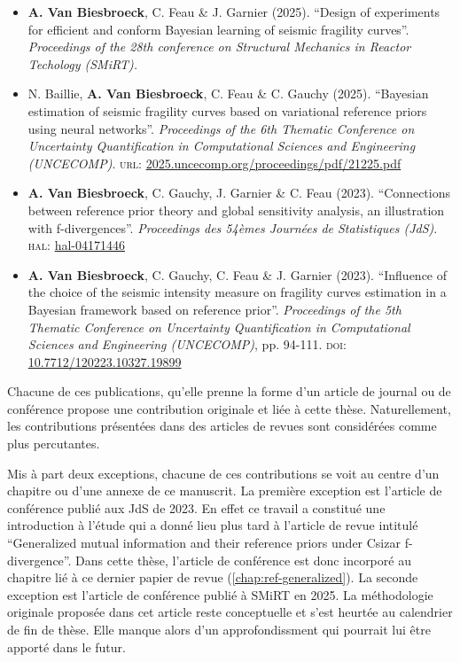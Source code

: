 \begin{itemize}
    \item \textbf{A. Van Biesbroeck}, C. Feau \& J. Garnier (2025). ``Design of experiments for efficient and conform Bayesian learning of seismic fragility curves''. \emph{Proceedings of the 28th conference on Structural Mechanics in Reactor Techology (SMiRT).}
    \item N. Baillie, \textbf{A. Van Biesbroeck}, C. Feau \& C. Gauchy (2025). ``Bayesian estimation of seismic fragility curves based on variational reference priors using neural networks''. \emph{Proceedings of the 6th Thematic Conference on Uncertainty Quantification in Computational Sciences and Engineering (UNCECOMP)}. \textsc{url:} \href{https://2025.uncecomp.org/proceedings/pdf/21225.pdf}{2025.uncecomp.org/proceedings/pdf/21225.pdf}
    \item \textbf{A. Van Biesbroeck}, C. Gauchy, J. Garnier \& C. Feau (2023). ``Connections between reference prior theory and global sensitivity analysis, an illustration with f-divergences''. \emph{Proceedings des 54èmes Journées de Statistiques (JdS)}. \textsc{hal:} \href{https://hal.science/hal-04171446}{hal-04171446}
    \item \textbf{A. Van Biesbroeck}, C. Gauchy, C. Feau \& J. Garnier (2023). ``Influence of the choice of the seismic intensity measure on fragility curves estimation in a Bayesian framework based on reference prior''. \emph{Proceedings of the 5th Thematic Conference on Uncertainty Quantification in Computational Sciences and Engineering (UNCECOMP)}, pp. 94-111. \textsc{doi:} \href{https://dx.doi.org/10.7712/120223.10327.19899}{10.7712/120223.10327.19899}
\end{itemize}


Chacune de ces publications, qu'elle prenne la forme d'un article de journal ou de conférence propose une contribution originale et liée à cette thèse. Naturellement, les contributions présentées dans des articles de revues sont considérées comme plus percutantes.

Mis à part deux exceptions, chacune de ces contributions se voit au centre d'un chapitre ou d'une annexe de ce manuscrit.
La première exception est l'article de conférence publié aux JdS de 2023. En effet ce travail a constitué une introduction à l'étude qui a donné lieu plus tard à l'article de revue intitulé ``Generalized mutual information and their reference priors under Csizar f-divergence''. Dans cette thèse, l'article de conférence est donc incorporé au chapitre lié à ce dernier papier de revue (\cref{chap:ref-generalized}).
La seconde exception est l'article de conférence publié à SMiRT en 2025. La méthodologie originale proposée dans cet article reste conceptuelle et s'est heurtée au calendrier de fin de thèse. %
Elle manque alors d'un approfondissment qui pourrait lui être apporté dans le futur.


